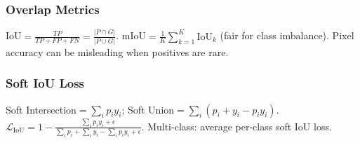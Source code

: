 \subsubsection*{Overlap Metrics}
IoU$=\frac{TP}{TP+FP+FN}=\frac{|P\cap G|}{|P\cup G|}$.
mIoU$=\frac{1}{K}\sum_{k=1}^K\text{IoU}_k$ (fair for class imbalance).
Pixel accuracy can be misleading when positives are rare.

\subsubsection*{Soft IoU Loss}
Soft Intersection$=\sum_i p_i y_i$; Soft Union$=\sum_i(p_i+y_i-p_iy_i)$.
$\mathcal{L}_{\text{IoU}}=1-\frac{\sum_i p_iy_i+\epsilon}{\sum_i p_i+\sum_i y_i-\sum_i p_iy_i+\epsilon}$.
Multi-class: average per-class soft IoU loss.
